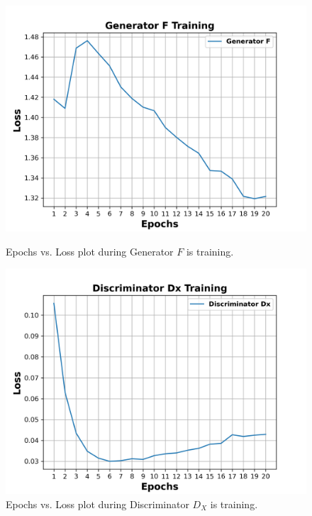 \vspace*{0.1cm}
\begin{figure}[H]
  \centering
  \begin{minipage}[b]{0.49\textwidth}
    \includegraphics[width=\textwidth]{images/Evaluation/GeneratorFTraining.png}
    \caption[Epochs vs. Loss plot during Generator $F$ is training.]{Epochs vs. Loss plot during Generator $F$ is training.}
    \label{fig:generatorF}
  \end{minipage}
  \hfill
  \begin{minipage}[b]{0.49\textwidth}
    \includegraphics[width=\textwidth]{images/Evaluation/DiscriminatorDxTraining.png}
    \caption[Epochs vs. Loss plot during Discriminator $D_X$ is training.]{Epochs vs. Loss plot during Discriminator $D_X$ is training.}
    \label{fig:discriminatorDx}
  \end{minipage}
\end{figure}


